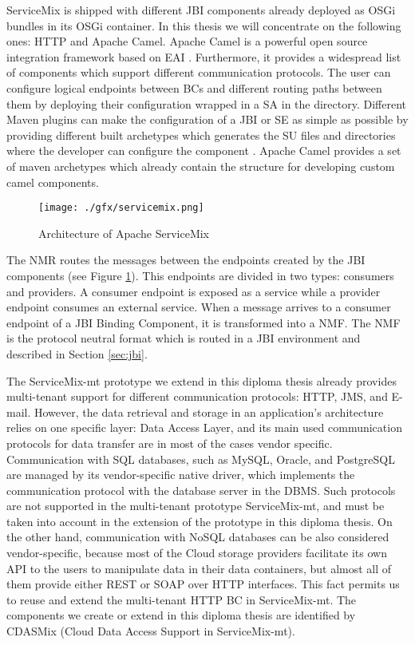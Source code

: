 ServiceMix is shipped with different \ac{JBI} components already deployed as \ac{OSGi} bundles in its \ac{OSGi} container. In this thesis we will concentrate on the following ones: HTTP and Apache Camel. Apache Camel is a powerful open source integration framework based on \ac{EAI} \cite{Camel2011}. Furthermore, it provides a widespread list of components which support different communication protocols.  The user can configure logical endpoints between \ac{BC}s and different routing paths between them by deploying their configuration wrapped in a \ac{SA} in the  directory. Different Maven plugins can make the configuration of a \ac{JBI} or \ac{SE} as simple as possible by providing different built archetypes which generates the \ac{SU} files and directories where the developer can configure the component \cite{MAVEN}. Apache Camel provides a set of maven archetypes which already contain the structure for developing custom camel components.

\begin{figure}[htb]
	\centering
		\texttt{[image: ./gfx/servicemix.png]}
	\caption[Architecture of Apache ServiceMix]{Architecture of Apache ServiceMix \cite{ASM} }
	\label{fig:servicemix}
\end{figure}

The \ac{NMR} routes the messages between the endpoints created by the \ac{JBI} components (see Figure \ref{fig:servicemix}). This endpoints are divided in two types: consumers and providers. A consumer endpoint is exposed as a service while a provider endpoint consumes an external service. When a message arrives to a consumer endpoint of a \ac{JBI} Binding Component, it is transformed into a \ac{NMF}. The \ac{NMF} is the protocol neutral format which is routed in a \ac{JBI} environment and described in Section \ref{sec:jbi}. 

The ServiceMix-mt prototype we extend in this diploma thesis already provides multi-tenant support for different communication protocols: HTTP, JMS, and E-mail. However, the data retrieval and storage in an application's architecture relies on one specific layer: Data Access Layer, and its main used communication protocols for data transfer are in most of the cases vendor specific. Communication with \ac{SQL} databases, such as MySQL, Oracle, and PostgreSQL are managed by its vendor-specific native driver, which implements the communication protocol with the database server in the \ac{DBMS}. Such protocols are not supported in the multi-tenant prototype ServiceMix-mt, and must be taken into account in the extension of the prototype in this diploma thesis. On the other hand, communication with \ac{NoSQL} databases can be also considered vendor-specific, because most of the Cloud storage providers facilitate its own API to the users to manipulate data in their data containers, but almost all of them provide either REST or \ac{SOAP} over \ac{HTTP} interfaces. This fact permits us to reuse and extend the multi-tenant HTTP \ac{BC} in ServiceMix-mt. The components we create or extend in this diploma thesis are identified by CDASMix (Cloud Data Access Support in ServiceMix-mt).

\FloatBarrier